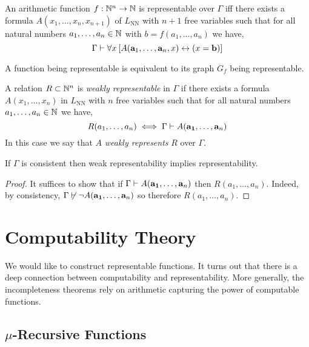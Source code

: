 \documentclass[12pt]{article}
\newcommand{\uq}[1]{\forall{#1} \:}
\begin{document}
\begin{definition}
An arithmetic function $f : \mathbb{N}^n \to \mathbb{N}$ is representable over $\Gamma$ iff there exists a formula $A(x_1, \dots, x_n, x_{n+1})$ of $L_{\text{NN}}$ with $n+1$ free variables such that for all natural numbers $a_1, \dots, a_n \in \mathbb{N}$ with $b = f(a_1, \dots, a_n)$ we have,
\[ \Gamma \proves \uq{x} [A(\bf{a}_1, \dots, \bf{a}_n, x) \leftrightarrow (x = \bf{b})] \]
\end{definition}

\begin{remark}
A function being representable is equivalent to its graph $G_f$ being representable. 
\end{remark}

\begin{definition}
A relation $R \subset \mathbb{N}^n$ is \textit{weakly representable} in $\Gamma$ if there exists a formula $A(x_1, \dots, x_n)$ in $L_{\text{NN}}$ with $n$ free variables such that for all natural numbers $a_1, \dots, a_n \in \mathbb{N}$ we have,
\[
R(a_1, \dots, a_n) \iff \Gamma \vdash A(\mathbf{a_1}, \dots, \mathbf{a}_n)
\]
In this case we say that $A$ \textit{weakly represents} $R$ over $\Gamma$.
\end{definition}

\begin{lemma}
If $\Gamma$ is consistent then weak representability implies representability.
\end{lemma}

\begin{proof}
It suffices to show that if $\Gamma \vdash A(\mathbf{a_1}, \dots, \mathbf{a}_n)$ then $R(a_1, \dots, a_n)$. Indeed, by consistency, $\Gamma \not\vdash \neg A(\mathbf{a_1}, \dots, \mathbf{a}_n)$ so therefore $R(a_1, \dots, a_n)$.
\end{proof}


\section{Computability Theory}

We would like to construct representable functions. It turns out that there is a deep connection between computability and  representability. More generally, the incompleteness theorems rely on arithmetic capturing the power of computable functions. 

\subsection{$\mu$-Recursive Functions}
\end{document}
